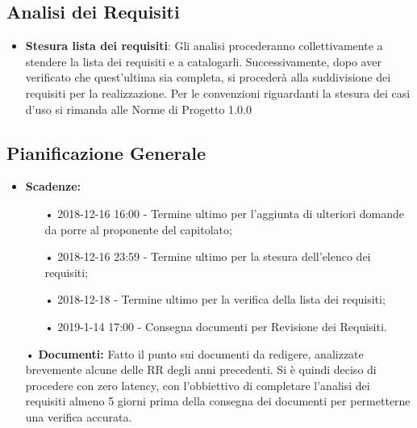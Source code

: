 \documentclass[a4paper, oneside, openany, dvipsnames, table]{article}
\begin{document}
\subsection{Analisi dei Requisiti}
\begin{itemize}
\item \textbf{Stesura lista dei requisiti}: Gli analisi procederanno collettivamente a stendere la lista dei requisiti e a catalogarli. Successivamente, dopo aver verificato che quest'ultima sia completa, si procederà alla suddivisione dei requisiti per la realizzazione.
Per le convenzioni riguardanti la stesura dei casi d'uso si rimanda alle Norme di Progetto 1.0.0
\end{itemize}

\subsection{Pianificazione Generale}
\begin{itemize}
\item \textbf{Scadenze:} 
\begin{itemize}
\item[•] 2018-12-16 16:00 - Termine ultimo per l'aggiunta di ulteriori domande da porre al proponente del capitolato;
\item[•] 2018-12-16 23:59 - Termine ultimo per la stesura dell'elenco dei requisiti;
\item[•] 2018-12-18 - Termine ultimo per la verifica della lista dei requisiti;
\item[•] 2019-1-14 17:00 - Consegna documenti per Revisione dei Requisiti.
\end{itemize}
\item[•] \textbf{Documenti:} Fatto il punto sui documenti da redigere, analizzate brevemente alcune delle RR degli anni precedenti. Si è quindi deciso di procedere con zero latency, con l'obbiettivo di completare l'analisi dei requisiti almeno 5 giorni prima della consegna dei documenti per permetterne una verifica accurata.
\end{itemize}


\newpage
\end{document}
